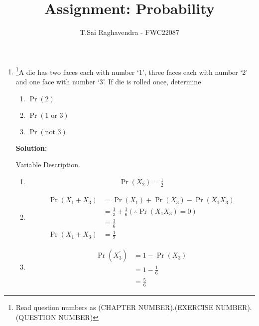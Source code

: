 \documentclass{article}
\providecommand{\pr}[1]{\ensuremath{\Pr\left(#1\right)}}
\newcommand{\solution}{\noindent \textbf{Solution: }}
\begin{document}
\title{Assignment: Probability}
\author{\Large T.Sai Raghavendra - FWC22087}
\date{}


\maketitle
\begin{enumerate}[label=16.\arabic{enumi}.\arabic{enumii}]%
\setcounter{enumi}{3}
\setcounter{enumii}{3}

\item \footnote{Read question numbers as (CHAPTER NUMBER).(EXERCISE NUMBER).(QUESTION NUMBER)}A die has two faces each with number ‘1’, three faces each with number ‘2’ and one face with number ‘3’. If die is rolled once, determine
\begin{enumerate}
\item $\pr{2}$
\item $\pr{1 \text{ or } 3}$
\item $\pr{\text{not } 3}$
\end{enumerate}

\solution
	\begin{table}[h]
	\centering 
	
	\caption{Variable Description.}
	\label{tables:16.4.3.2}
	\end{table}

\begin{enumerate}
\item \begin{align}
\pr{X_2} = \frac{1}{2}  %
\end{align}	
\item 
\begin{align}
\pr{X_1 + X_3}	&= \pr{X_1} + \pr{X_3} - \pr{X_1X_3}\\
				&= \frac{1}{3} + \frac{1}{6}   (\therefore \pr{X_1X_3} = 0)\\
				&= \frac{3}{6}\\
\pr{X_1 + X_3} 	&= \frac{1}{2}
\end{align}
\item 
\begin{align}
\pr{X_3^{\prime}} &= 1 - \pr{X_3}\\
			   &= 1 - \frac{1}{6}\\
			   &= \frac{5}{6}
\end{align}
\end{enumerate}
\end{enumerate}
\end{document}
